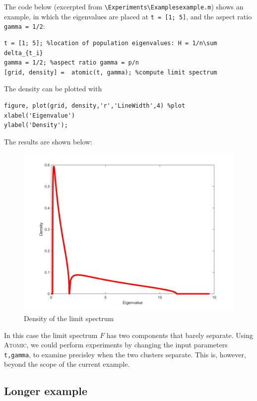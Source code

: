 \documentclass[english,11pt]{article} %
\begin{document}
The code below (excerpted from \verb+\Experiments\Examplesexample.m+) shows an example, in which the eigenvalues are placed at \verb+t = [1; 5]+, and the aspect ratio \verb+gamma = 1/2+:


\begin{verbatim}
t = [1; 5]; %location of population eigenvalues: H = 1/n\sum delta_{t_i}
gamma = 1/2; %aspect ratio gamma = p/n
[grid, density] =  atomic(t, gamma); %compute limit spectrum
\end{verbatim}

The density can be plotted with 

\begin{verbatim}
figure, plot(grid, density,'r','LineWidth',4) %plot
xlabel('Eigenvalue')
ylabel('Density');
\end{verbatim}

The results are shown below:

\begin{figure}[ht!]
\centering
\includegraphics[scale=0.5]{"../Experiments/Examples/quick_example"}
\caption{Density of the limit spectrum}
\label{scatter_prior_current}
\end{figure}

In this case the limit spectrum $F$ has two components that barely separate. Using \textsc{Atomic}, we could perform experiments by changing the input parameters \verb+t,gamma+, to examine precisley when the two clusters separate. This is, however, beyond the scope of the current example.

\subsection{Longer example}
\end{document}

